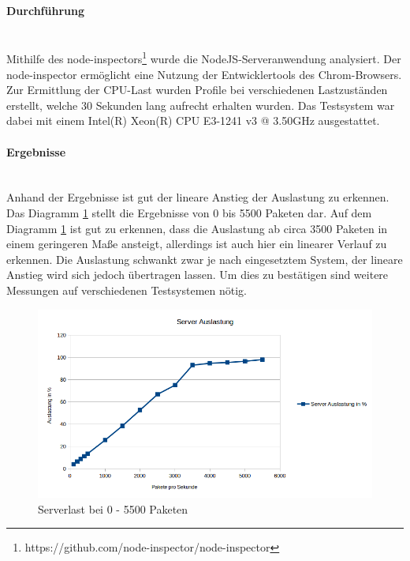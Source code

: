 \documentclass[a4paper]{spie}  %
\begin{document}
\paragraph{Durchführung}\mbox{}\\
Mithilfe des node-inspectors\footnote{https://github.com/node-inspector/node-inspector} wurde die NodeJS-Serveranwendung analysiert. Der node-inspector ermöglicht eine Nutzung der Entwicklertools des Chrom-Browsers. Zur Ermittlung der CPU-Last wurden Profile bei verschiedenen Lastzuständen erstellt, welche 30 Sekunden lang aufrecht erhalten wurden. Das Testsystem war dabei mit einem Intel(R) Xeon(R) CPU E3-1241 v3 @ 3.50GHz ausgestattet.

\begin{minipage}[t]{0.4\textwidth}
	\vspace{0pt}
	\paragraph{Ergebnisse}\mbox{}\\
	Anhand der Ergebnisse ist gut der lineare Anstieg der Auslastung zu erkennen. Das Diagramm \ref{fig:ServerLast2} stellt die Ergebnisse von 0 bis 5500 Paketen dar. Auf dem Diagramm \ref{fig:ServerLast2} ist gut zu erkennen, dass die Auslastung ab circa 3500 Paketen in einem geringeren Maße ansteigt, allerdings ist auch hier ein linearer Verlauf zu erkennen. Die Auslastung schwankt zwar je nach eingesetztem System, der lineare Anstieg wird sich jedoch übertragen lassen. Um dies zu bestätigen sind weitere Messungen auf verschiedenen Testsystemen nötig.
\end{minipage}
\hfill
\begin{minipage}[t]{0.5\textwidth}
	\begin{figure}[H]	
	\vspace{0pt}
		\centering
		\includegraphics[width=1\textwidth]{./images/ServerLast3.png}
		\caption{Serverlast bei 0 - 5500 Paketen}
		\label{fig:ServerLast2}
	\end{figure}		
\end{minipage}
\end{document}
